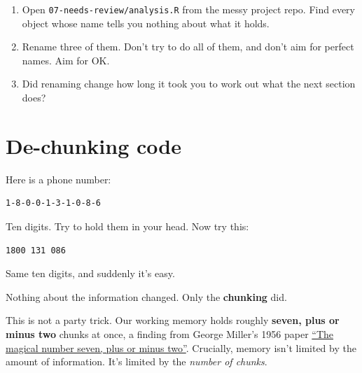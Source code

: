 \documentclass[
  letterpaper,
  justified,
  a4paper]{tufte-book}
\providecommand{\tightlist}{%
  \setlength{\itemsep}{0pt}\setlength{\parskip}{0pt}}
\providecommand{\tightlist}{%
  \setlength{\itemsep}{0pt}\setlength{\parskip}{0pt}}
\begin{document}
\begin{tcolorbox}[enhanced jigsaw, arc=.35mm, bottomrule=.15mm, bottomtitle=1mm, breakable, colback=white, colbacktitle=quarto-callout-note-color!10!white, colframe=quarto-callout-note-color-frame, coltitle=black, left=2mm, leftrule=.75mm, opacityback=0, opacitybacktitle=0.6, rightrule=.15mm, title=\textcolor{quarto-callout-note-color}{\faInfo}\hspace{0.5em}{Your Turn}, titlerule=0mm, toprule=.15mm, toptitle=1mm]

\begin{enumerate}
\def\labelenumi{\arabic{enumi}.}
\tightlist
\item
  Open \texttt{07-needs-review/analysis.R} from the messy project repo.
  Find every object whose name tells you nothing about what it holds.
\item
  Rename three of them. Don't try to do all of them, and don't aim for
  perfect names. Aim for OK.
\item
  Did renaming change how long it took you to work out what the next
  section does?
\end{enumerate}

\end{tcolorbox}

\section{De-chunking code}\label{de-chunking-code}

Here is a phone number:

\begin{verbatim}
1-8-0-0-1-3-1-0-8-6
\end{verbatim}

Ten digits. Try to hold them in your head. Now try this:

\begin{verbatim}
1800 131 086
\end{verbatim}

Same ten digits, and suddenly it's easy.

Nothing about the information changed. Only the \textbf{chunking} did.

This is not a party trick. Our working memory holds roughly
\textbf{seven, plus or minus two} chunks at once, a finding from George
Miller's 1956 paper
\href{https://en.wikipedia.org/wiki/The_Magical_Number_Seven,_Plus_or_Minus_Two}{``The
magical number seven, plus or minus two''}. Crucially, memory isn't
limited by the amount of information. It's limited by the \emph{number
of chunks}.
\end{document}
